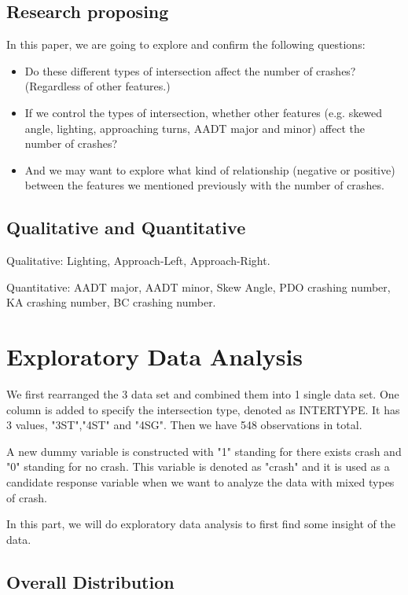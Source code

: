 \documentclass[11pt]{scrartcl} %
\begin{document}
\subsection{Research proposing}

In this paper, we are going to explore and confirm the following questions:
\begin{itemize}
	\item Do these different types of intersection affect the number of crashes? (Regardless of other features.)
	\item If we control the types of intersection, whether other features (e.g. skewed angle, lighting, approaching turns, AADT major and minor) affect the number of crashes?
	\item And we may want to explore what kind of relationship (negative or positive) between the features we mentioned previously with the number of crashes.
\end{itemize}

\subsection{Qualitative and Quantitative}

Qualitative: Lighting, Approach-Left, Approach-Right.

Quantitative: AADT major, AADT minor, Skew Angle, PDO crashing number, KA crashing number, BC crashing number.

\section{Exploratory Data Analysis}
We first rearranged the 3 data set and combined them into 1 single data set. One column is added to specify the intersection type, denoted as INTERTYPE. It has 3 values, "3ST","4ST" and "4SG". Then we have 548 observations in total.

A new dummy variable is constructed with "1" standing for there exists crash and "0" standing for no crash. This variable is denoted as "crash" and it is used as a candidate response variable when we want to analyze the data with mixed types of crash.

In this part, we will do exploratory data analysis to first find some insight of the data.

\subsection{Overall Distribution}
\end{document}
